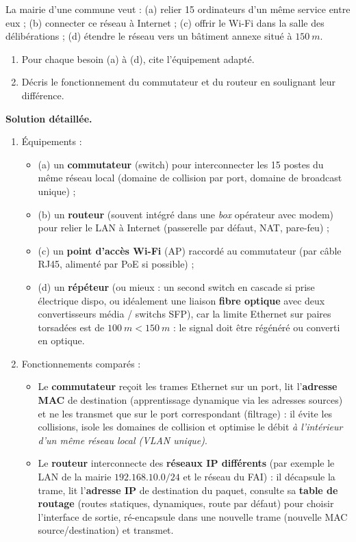 \documentclass[11pt]{article}
\begin{document}
\begin{exoresolu}
La mairie d'une commune veut : (a) relier 15 ordinateurs d'un même service entre eux ; (b) connecter ce réseau à Internet ; (c) offrir le Wi-Fi dans la salle des délibérations ; (d) étendre le réseau vers un bâtiment annexe situé à $\SI{150}{m}$.
\begin{enumerate}
  \item Pour chaque besoin (a) à (d), cite l'équipement adapté.
  \item Décris le fonctionnement du commutateur et du routeur en soulignant leur différence.
\end{enumerate}
\tcblower
\textbf{Solution détaillée.}
\begin{enumerate}
  \item Équipements :
  \begin{itemize}
    \item (a) un \textbf{commutateur} (switch) pour interconnecter les 15 postes du même réseau local (domaine de collision par port, domaine de broadcast unique) ;
    \item (b) un \textbf{routeur} (souvent intégré dans une \emph{box} opérateur avec modem) pour relier le LAN à Internet (passerelle par défaut, NAT, pare-feu) ;
    \item (c) un \textbf{point d'accès Wi-Fi} (AP) raccordé au commutateur (par câble RJ45, alimenté par PoE si possible) ;
    \item (d) un \textbf{répéteur} (ou mieux : un second switch en cascade si prise électrique dispo, ou idéalement une liaison \textbf{fibre optique} avec deux convertisseurs média / switchs SFP), car la limite Ethernet sur paires torsadées est de $\SI{100}{m} < \SI{150}{m}$ : le signal doit être régénéré ou converti en optique.
  \end{itemize}
  \item Fonctionnements comparés :
  \begin{itemize}
    \item Le \textbf{commutateur} reçoit les trames Ethernet sur un port, lit l'\textbf{adresse MAC} de destination (apprentissage dynamique via les adresses sources) et ne les transmet que sur le port correspondant (filtrage) : il évite les collisions, isole les domaines de collision et optimise le débit \emph{à l'intérieur d'un même réseau local (VLAN unique)}.
    \item Le \textbf{routeur} interconnecte des \textbf{réseaux IP différents} (par exemple le LAN de la mairie $192.168.10.0/24$ et le réseau du FAI) : il décapsule la trame, lit l'\textbf{adresse IP} de destination du paquet, consulte sa \textbf{table de routage} (routes statiques, dynamiques, route par défaut) pour choisir l'interface de sortie, ré-encapsule dans une nouvelle trame (nouvelle MAC source/destination) et transmet.

\end{itemize}
\end{enumerate}
\end{exoresolu}
\end{document}
